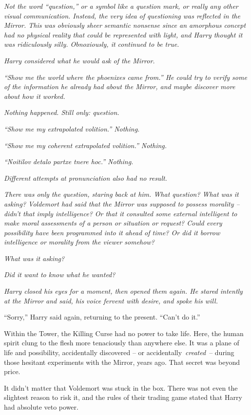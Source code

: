 \emph{Not the word ``question,'' or a symbol like a question mark, or
really any other visual communication. Instead, the very idea of
questioning was reflected in the Mirror. This was obviously sheer
semantic nonsense since an amorphous concept had no physical reality
that could be represented with light, and Harry thought it was
ridiculously silly. Obnoxiously, it continued to be true.}

\emph{Harry considered what he would ask of the Mirror.}

\emph{``Show me the world where the phoenixes came from.'' He could try
to verify some of the information he already had about the Mirror, and
maybe discover more about how it worked.}

\emph{Nothing happened. Still only: question.}

\emph{``Show me my extrapolated volition.'' Nothing.}

\emph{``Show me my coherent extrapolated volition.'' Nothing.}

\emph{``Noitilov detalo partxe tnere hoc.'' Nothing.}

\emph{Different attempts at pronunciation also had no result.}

\emph{There was only the question, staring back at him. What question?
What was it asking? Voldemort had said that the Mirror was supposed to
possess morality -- didn't that imply intelligence? Or that it consulted
some external intelligent to make moral assessments of a person or
situation or request? Could every possibility have been programmed into
it ahead of time? Or did it borrow intelligence or morality from the
viewer somehow?}

\emph{What was it asking?}

\emph{Did it want to know what he wanted?}

\emph{Harry closed his eyes for a moment, then opened them again. He
stared intently at the Mirror and said, his voice fervent with desire,
and spoke his will.}

``Sorry,'' Harry said again, returning to the present. ``Can't do it.''

Within the Tower, the Killing Curse had no power to take life. Here, the
human spirit clung to the flesh more tenaciously than anywhere else. It
was a plane of life and possibility, accidentally discovered -- or
accidentally~\emph{created}~-- during those hesitant experiments with
the Mirror, years ago. That secret was beyond price.

It didn't matter that Voldemort was stuck in the box. There was not even
the slightest reason to risk it, and the rules of their trading game
stated that Harry had absolute veto power.

